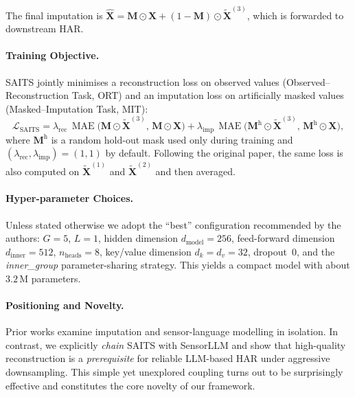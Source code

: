 \noindent The final imputation is $\hat{\mathbf{X}}=\mathbf{M}\odot\mathbf{X}+(1-\mathbf{M})\odot\mathbf{\tilde X}^{(3)}$, which is forwarded to downstream HAR.

\paragraph{Training Objective.}  SAITS jointly minimises a reconstruction loss on observed values (Observed–Reconstruction Task, ORT) and an imputation loss on artificially masked values (Masked–Imputation Task, MIT):
\[
\mathcal{L}_{\text{SAITS}}=
\lambda_{\text{rec}}\,\operatorname{MAE}\bigl(\mathbf{M}\odot\mathbf{\tilde X}^{(3)},\,\mathbf{M}\odot\mathbf{X}\bigr)+
\lambda_{\text{imp}}\,\operatorname{MAE}\bigl(\mathbf{M}^{\mathrm h}\odot\mathbf{\tilde X}^{(3)},\,\mathbf{M}^{\mathrm h}\odot\mathbf{X}\bigr),
\]
where $\mathbf{M}^{\mathrm h}$ is a random hold-out mask used only during training and $(\lambda_{\text{rec}},\lambda_{\text{imp}})=(1,1)$ by default.  Following the original paper, the same loss is also computed on $\mathbf{\tilde X}^{(1)}$ and $\mathbf{\tilde X}^{(2)}$ and then averaged.

\paragraph{Hyper-parameter Choices.}  Unless stated otherwise we adopt the ``best'' configuration recommended by the authors: $G{=}5$, $L{=}1$, hidden dimension $d_{\text{model}}{=}256$, feed-forward dimension $d_{\text{inner}}{=}512$, $n_{\text{heads}}{=}8$, key/value dimension $d_k{=}d_v{=}32$, dropout~$0$, and the \textit{inner\_group} parameter-sharing strategy.  This yields a compact model with about $3.2\,$M parameters.

\paragraph{Positioning and Novelty.}  Prior works \cite{Du2023SAITS, li2024sensorllm} examine imputation and sensor-language modelling in isolation. In contrast, we explicitly \emph{chain} SAITS with SensorLLM and show that high-quality reconstruction is a \emph{prerequisite} for reliable LLM-based HAR under aggressive downsampling. This simple yet unexplored coupling turns out to be surprisingly effective and constitutes the core novelty of our framework.

